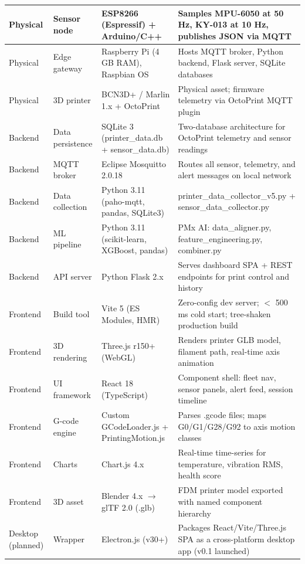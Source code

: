\begin{longtable}{|P{2.8cm}|P{3.2cm}|P{4.0cm}|P{4.5cm}|}
	Physical & Sensor node & ESP8266 (Espressif) + Arduino/C++ & Samples MPU-6050 at 50 Hz, KY-013 at 10 Hz, publishes JSON via MQTT \\
	\hline
	Physical & Edge gateway & Raspberry Pi (4 GB RAM), Raspbian OS & Hosts MQTT broker, Python backend, Flask server, SQLite databases \\
	\hline
	Physical & 3D printer & BCN3D+ / Marlin 1.x + OctoPrint & Physical asset; firmware telemetry via OctoPrint MQTT plugin \\
	\hline
	Backend & Data persistence & SQLite 3 (printer\_data.db + sensor\_data.db) & Two-database architecture for OctoPrint telemetry and sensor readings \\
	\hline
	Backend & MQTT broker & Eclipse Mosquitto 2.0.18 & Routes all sensor, telemetry, and alert messages on local network \\
	\hline
	Backend & Data collection & Python 3.11 (paho-mqtt, pandas, SQLite3) & printer\_data\_collector\_v5.py + sensor\_data\_collector.py \\
	\hline
	Backend & ML pipeline & Python 3.11 (scikit-learn, XGBoost, pandas) & PMx AI: data\_aligner.py, feature\_engineering.py, combiner.py \\
	\hline
	Backend & API server & Python Flask 2.x & Serves dashboard SPA + REST endpoints for print control and history \\
	\hline
	Frontend & Build tool & Vite 5 (ES Modules, HMR) & Zero-config dev server; $<$ 500 ms cold start; tree-shaken production build \\
	\hline
	Frontend & 3D rendering & Three.js r150+ (WebGL) & Renders printer GLB model, filament path, real-time axis animation \\
	\hline
	Frontend & UI framework & React 18 (TypeScript) & Component shell: fleet nav, sensor panels, alert feed, session timeline \\
	\hline
	Frontend & G-code engine & Custom GCodeLoader.js + PrintingMotion.js & Parses .gcode files; maps G0/G1/G28/G92 to axis motion classes \\
	\hline
	Frontend & Charts & Chart.js 4.x & Real-time time-series for temperature, vibration RMS, health score \\
	\hline
	Frontend & 3D asset & Blender 4.x $\rightarrow$ glTF 2.0 (.glb) & FDM printer model exported with named component hierarchy \\
	\hline
	Desktop (planned) & Wrapper & Electron.js (v30+) & Packages React/Vite/Three.js SPA as a cross-platform desktop app (v0.1 launched) \\
	\hline
\end{longtable}